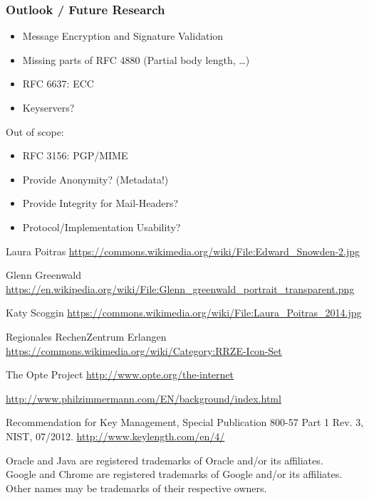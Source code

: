 \documentclass{beamer}
\begin{document}
\begin{frame}
	\frametitle{Outlook / Future Research}
	
	\begin{itemize}
		\item Message Encryption and Signature Validation
		\item Missing parts of RFC 4880 (Partial body length, \ldots)
		\item RFC 6637: ECC
		\item Keyservers?
	\end{itemize}
	Out of scope:
	\begin{itemize}
	    \item RFC 3156: PGP/MIME
		\item Provide Anonymity? (Metadata!)%
		\item Provide Integrity for Mail-Headers?
		\item Protocol/Implementation Usability?
	\end{itemize}
	
\end{frame}



  
\begin{frame}

\begin{thebibliography}{1}
\scriptsize

	 Laura Poitras \url{https://commons.wikimedia.org/wiki/File:Edward_Snowden-2.jpg} 
	
	 Glenn Greenwald  \url{https://en.wikipedia.org/wiki/File:Glenn_greenwald_portrait_transparent.png}
	
	 Katy Scoggin \url{https://commons.wikimedia.org/wiki/File:Laura_Poitras_2014.jpg}
	
	 Regionales RechenZentrum Erlangen  \url{https://commons.wikimedia.org/wiki/Category:RRZE-Icon-Set}
	
	  The Opte Project \url{http://www.opte.org/the-internet}
	
	 \url{http://www.philzimmermann.com/EN/background/index.html}
	
	 Recommendation for Key Management, Special Publication 800-57 Part 1 Rev. 3, NIST, 07/2012. \url{http://www.keylength.com/en/4/}

\end{thebibliography}
\end{frame}

\begin{frame}
	
	\tiny
	Oracle and Java are registered trademarks of Oracle and/or its affiliates. \\
	Google and Chrome are registered trademarks of Google and/or its affiliates. \\
	Other names may be trademarks of their respective owners.

\end{frame}
\end{document}

